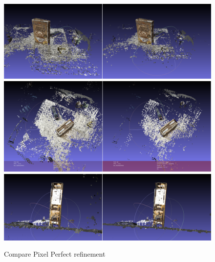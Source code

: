 \documentclass[11pt]{article}
\begin{document}
    \begin{figure}
    \caption{Compare Pixel Perfect refinement}
    \centering
    \includegraphics[width=\textwidth,height=\textheight,keepaspectratio]{images/cereal.1.png}
    \includegraphics[width=\textwidth,height=\textheight,keepaspectratio]{images/cereal.2.png}
    \includegraphics[width=\textwidth,height=\textheight,keepaspectratio]{images/cereal.3.png}
    \label{fig:cereal}
    \end{figure}
\end{document}
